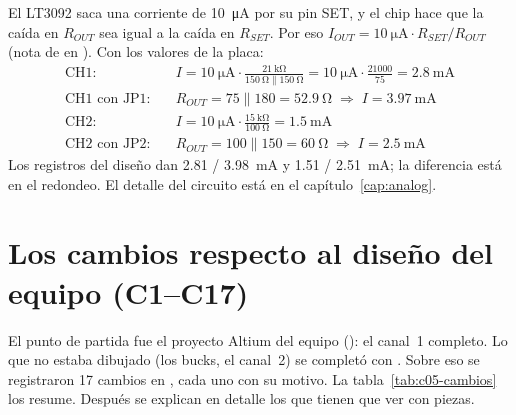 \begin{calculo}
El LT3092 saca una corriente de \SI{10}{\micro\ampere} por su pin SET, y el chip hace que la caída en $R_{OUT}$ sea igual a la caída en $R_{SET}$. Por eso $I_{OUT}=\SI{10}{\micro\ampere}\cdot R_{SET}/R_{OUT}$ (nota de  en ). Con los valores de la placa:
\begin{align*}
\text{CH1:}\quad & I=\SI{10}{\micro\ampere}\cdot\frac{\SI{21}{\kilo\ohm}}{\SI{150}{\ohm}\parallel\SI{150}{\ohm}}=\SI{10}{\micro\ampere}\cdot\frac{21000}{75}=\SI{2.8}{\milli\ampere}\\
\text{CH1 con JP1:}\quad & R_{OUT}=75\parallel180=\SI{52.9}{\ohm}\;\Rightarrow\; I=\SI{3.97}{\milli\ampere}\\
\text{CH2:}\quad & I=\SI{10}{\micro\ampere}\cdot\frac{\SI{15}{\kilo\ohm}}{\SI{100}{\ohm}}=\SI{1.5}{\milli\ampere}\\
\text{CH2 con JP2:}\quad & R_{OUT}=100\parallel150=\SI{60}{\ohm}\;\Rightarrow\; I=\SI{2.5}{\milli\ampere}
\end{align*}
Los registros del diseño dan \SI{2.81}{} / \SI{3.98}{\milli\ampere} y \SI{1.51}{} / \SI{2.51}{\milli\ampere}; la diferencia está en el redondeo. El detalle del circuito está en el capítulo~\ref{cap:analog}.
\end{calculo}

\section{Los cambios respecto al diseño del equipo (C1--C17)}\label{sec:c05-cambios}

El punto de partida fue el proyecto Altium del equipo (): el canal~1 completo. Lo que no estaba dibujado (los bucks, el canal~2) se completó con . Sobre eso se registraron 17 cambios en , cada uno con su motivo. La tabla~\ref{tab:c05-cambios} los resume. Después se explican en detalle los que tienen que ver con piezas.

